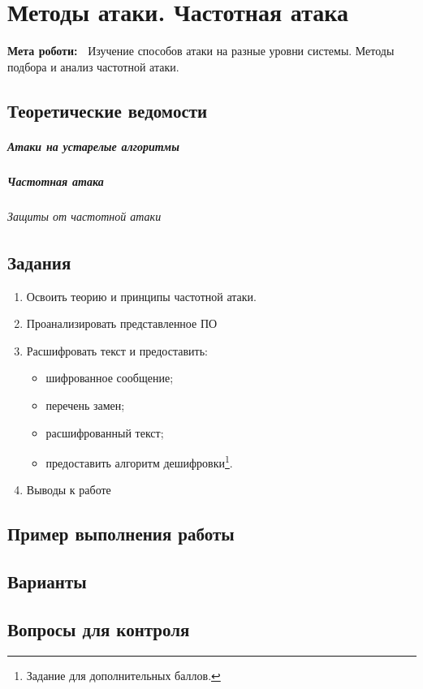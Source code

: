 \chapter{Методы атаки. Частотная атака} \label{chapt3}%
\textbf{Мета роботи:~}%
Изучение способов атаки на разные уровни системы. Методы подбора и анализ
частотной атаки.
\section{Теоретические ведомости} \label{sect2_a}
%
\paragraph{Атаки на устарелые алгоритмы}

\paragraph{Частотная атака}

\subparagraph{Защиты от частотной атаки}

\section{Задания}\label{sect2_b}
%
\begin{enumerate}
  \item Освоить теорию и принципы частотной атаки.
  \item Проанализировать представленное ПО
  \item Расшифровать текст и предоставить: %
  \begin{itemize}
    \item шифрованное сообщение;
    \item перечень замен;
    \item расшифрованный текст;
    \item предоставить алгоритм дешифровки\footnote{Задание для
        дополнительных баллов.}.
  \end{itemize}
  \item Выводы к работе
\end{enumerate}
\section{Пример выполнения работы}\label{sect2_c}
%
\section{Варианты}\label{sect2_d}
%
\section{Вопросы для контроля}\label{sect2_e}
%
